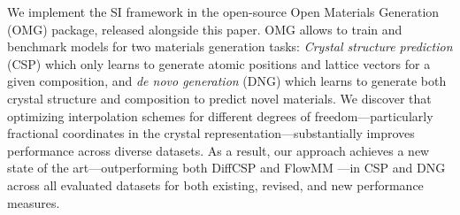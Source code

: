 We implement the SI framework in the open-source Open Materials Generation (OMG) package, released alongside this paper. OMG allows to train and benchmark models for two materials generation tasks: \emph{Crystal structure prediction} (CSP) which only learns to generate atomic positions and lattice vectors for a given composition, and \emph{de novo generation} (DNG) which learns to generate both crystal structure and composition to predict novel materials. 
We discover that optimizing interpolation schemes for different degrees of freedom---particularly fractional coordinates in the crystal representation---substantially improves performance across diverse datasets. As a result, our approach achieves a new state of the art---outperforming both DiffCSP \citep{jiao_crystal_2023} and FlowMM \citep{miller_flowmm_2024}---in CSP and DNG across all evaluated datasets for both existing, revised, and new performance measures.

